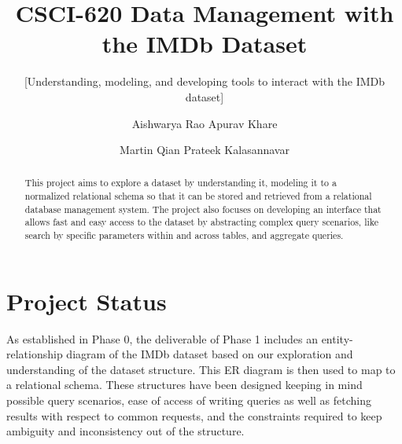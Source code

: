\documentclass{sig-alternate}
\title{CSCI-620 Data Management with the IMDb Dataset}
\subtitle{[Understanding, modeling, and developing tools to interact with the IMDb dataset]}
\author
{
	\alignauthor
	Aishwarya Rao
	\email{ar2711@rit.edu}
	\alignauthor
	Apurav Khare
	\email{ak2816@rit.edu}
	\and
	\alignauthor
	Martin Qian
	\email{jq3513@rit.edu}
	\alignauthor
	Prateek Kalasannavar
	\email{pk6685@rit.edu}
}
\begin{document}
	\maketitle
	\begin{abstract}
		This project aims to explore a dataset by understanding it, modeling it to a normalized relational schema so that it can be stored and retrieved from a relational database management system. The project also focuses on developing an interface that allows fast and easy access to the dataset by abstracting complex query scenarios, like search by specific parameters within and across tables, and aggregate queries.
	\end{abstract}
	
	\section{Project Status}
	As established in Phase 0, the deliverable of Phase 1 includes an entity-relationship diagram of the IMDb dataset based on our exploration and understanding of the dataset structure. This ER diagram is then used to map to a relational schema. These structures have been designed keeping in mind possible query scenarios, ease of access of writing queries as well as fetching results with respect to common requests, and the constraints required to keep ambiguity and inconsistency out of the structure. 
\end{document}
